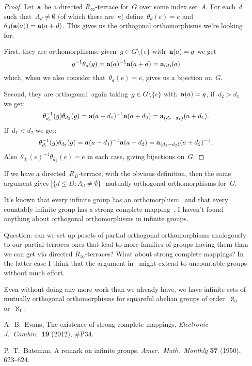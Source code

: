 \documentclass[a4paper,12pt]{article}
\begin{document}
\begin{proof}
Let~${\bf a}$ be a directed $R_{\infty}$-terrace for~$G$ over some index set~$A$.  For each~$d$ such that~$A_d \neq \emptyset$ (of which there are~$\kappa$) define~$\theta_d(e) = e$ and $\theta_d( {\bf a}(a) ) = {\bf a}(a+d)$.  This gives us the orthogonal orthomorphisms we're looking for:

First, they are orthomorphisms: given~$g \in G \setminus \{ e \}$ with~${\bf a}(a) = g$ we get
$$g^{-1}\theta_d(g) = {\bf a}(a)^{-1}{\bf a}(a+d) = {\bf a}_{(d)}(a)$$
which, when we also consider that~$\theta_d(e)=e$, gives us a bijection on~$G$.

Second, they are orthogonal: again taking~$g \in G \setminus \{ e \}$ with~${\bf a}(a) = g$, if~$d_2 > d_1$ we get: 
$$\theta_{d_1}^{-1}(g) \theta_{d_2}(g) =  {\bf a}(a+d_1)^{-1}{\bf a}(a+d_2)  = {\bf a}_{(d_2 - d_1)}(a+d_1) .       $$
If~$d_1 < d_2$ we get:
$$\theta_{d_1}^{-1}(g) \theta_{d_2}(g) =  {\bf a}(a+d_1)^{-1}{\bf a}(a+d_2)  = {\bf a}_{(d_1 - d_2)}(a+d_2)^{-1} .       $$
Also~$\theta_{d_1}(e)^{-1}\theta_{d_2}(e) =e$ in each case, giving bijections on~$G$.
\end{proof}

If we have a directed~$R_D$-terrace, with the obvious definition, then the same argument gives $ | \{ d \leq D : A_d \neq \emptyset \} |$ mutually orthogonal orthomorphisms for~$G$.

It's known that every infinite group has an orthomorphism~\cite{Bateman50} and that every countably infinite group has a strong complete mapping~\cite{Evans12}.  I haven't found anything about orthogonal orthomorphisms in infinite groups.


Question: can we set up posets of partial orthogonal orthomorphisms analogously to our partial terraces ones that lead to more families of groups having them than we can get via directed $R_{\infty}$-terraces?  What about strong complete mappings? In the latter case I think that the argument in~\cite{Evans12} might extend to uncountable groups without much effort.

Even without doing any more work than we already have, we have infinite sets of mutually orthogonal orthomorphisms for squareful abelian groups of order~$\aleph_0$ or~$\aleph_1$.



\begin{thebibliography}{99}

A.~B.~Evans, The existence of strong complete mappings, {\em Electronic J.~Combin.}~{\bf 19} (2012), \#P34.

P.~T.~Bateman, A remark on infinite groups, {\em Amer.~Math.~Monthly} {\bf 57} (1950), 623--624.




\end{thebibliography}
\end{document}
